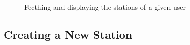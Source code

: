 \begin{figure}[h]
\centering
{}
\caption{Fecthing and displaying the stations of a given user}
\label{fig:mys}
\end{figure}



\subsection{Creating a New Station}

